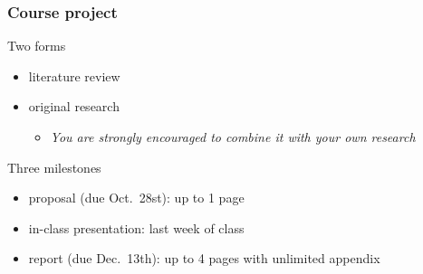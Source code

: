 \documentclass[compress,
mathserif,wide,%
]{beamer}
\begin{document}
\begin{frame}
\frametitle{Course project}

Two forms
\begin{itemize}
\itemsep0.5em
\item literature review
\item original research
\begin{itemize}
  \item \alert{\em You are strongly encouraged to combine it with your own research}
\end{itemize}
\end{itemize}

\pause
\vfill

Three milestones

\begin{itemize}
\itemsep0.5em
\item proposal (due Oct.~28st): up to 1 page
\item in-class presentation: last week of class
\item report (due Dec.~13th): up to 4 pages with unlimited appendix
\end{itemize}


\end{frame}












\end{document}
